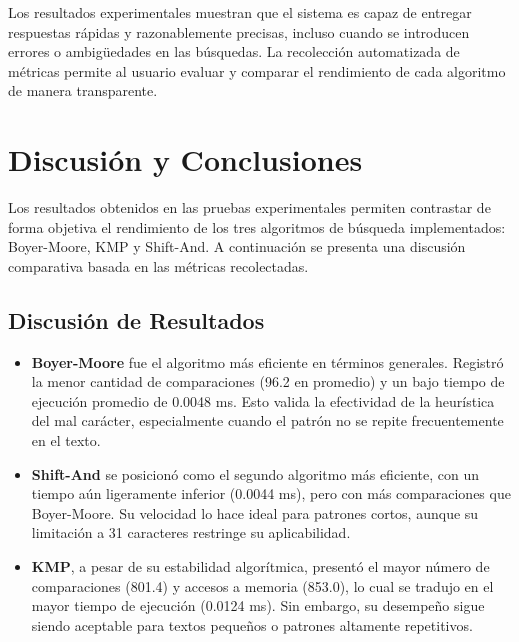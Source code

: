 \documentclass[9pt,letterpaper,onecolumn]{rho-class/rho}
\begin{document}

Los resultados experimentales muestran que el sistema es capaz de entregar respuestas rápidas y razonablemente precisas, incluso cuando se introducen errores o ambigüedades en las búsquedas. La recolección automatizada de métricas permite al usuario evaluar y comparar el rendimiento de cada algoritmo de manera transparente.


\section{Discusión y Conclusiones}
\label{sec:conclusiones}

Los resultados obtenidos en las pruebas experimentales permiten contrastar de forma objetiva el rendimiento de los tres algoritmos de búsqueda implementados: Boyer-Moore, KMP y Shift-And. A continuación se presenta una discusión comparativa basada en las métricas recolectadas.

\subsection{Discusión de Resultados}

\begin{itemize}
    \item \textbf{Boyer-Moore} fue el algoritmo más eficiente en términos generales. Registró la menor cantidad de comparaciones (96.2 en promedio) y un bajo tiempo de ejecución promedio de 0.0048 ms. Esto valida la efectividad de la heurística del mal carácter, especialmente cuando el patrón no se repite frecuentemente en el texto.

    \item \textbf{Shift-And} se posicionó como el segundo algoritmo más eficiente, con un tiempo aún ligeramente inferior (0.0044 ms), pero con más comparaciones que Boyer-Moore. Su velocidad lo hace ideal para patrones cortos, aunque su limitación a 31 caracteres restringe su aplicabilidad.

    \item \textbf{KMP}, a pesar de su estabilidad algorítmica, presentó el mayor número de comparaciones (801.4) y accesos a memoria (853.0), lo cual se tradujo en el mayor tiempo de ejecución (0.0124 ms). Sin embargo, su desempeño sigue siendo aceptable para textos pequeños o patrones altamente repetitivos.
\end{itemize}
\end{document}
